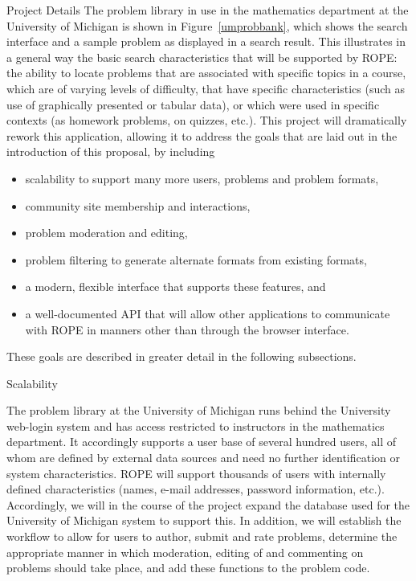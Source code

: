 \documentclass[11pt]{article}
\begin{document}
\begin{section}{Project Details}
The problem library in use in the mathematics department at the University
of Michigan is shown in Figure~\ref{umprobbank}, which shows the
search interface and a sample problem as displayed in a search result.
This illustrates in a general way the basic search characteristics that
will be supported by ROPE: the ability to locate problems that are
associated with specific topics in a course, which are of varying levels
of difficulty, that have specific characteristics (such as use of
graphically presented or tabular data), or which were used in specific
contexts (as homework problems, on quizzes, etc.).  This project will
dramatically rework this application, allowing it to address the goals
that are laid out in the introduction of this proposal, by including
\begin{itemize}
  \item
    scalability to support many more users, problems and problem formats,
  \item 
    community site membership and interactions,
  \item 
    problem moderation and editing,
  \item 
    problem filtering to generate alternate formats from existing
    formats,
  \item
    a modern, flexible interface that supports these features, and
  \item
    a well-documented API that will allow other applications to
    communicate with ROPE in manners other than through the browser
    interface.
\end{itemize}
These goals are described in greater detail in the following subsections.

\begin{subsection}{Scalability}

The problem library at the University of Michigan runs behind the
University web-login system and has access restricted to instructors in
the mathematics department. It accordingly supports a user base of several
hundred users, all of whom are defined by external data sources and need
no further identification or system characteristics. ROPE will support
thousands of users with internally defined characteristics (names, e-mail
addresses, password information, etc.). Accordingly, we will in the course
of the project expand the database used for the University of Michigan
system to support this. In addition, we will establish the workflow to
allow for users to author, submit and rate problems, determine the
appropriate manner in which moderation, editing of and commenting on
problems should take place, and add these functions to the problem code.


\end{subsection}
\end{section}
\end{document}
